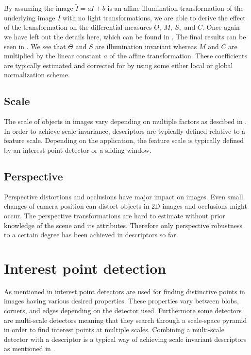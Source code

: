 \documentclass[thesis.tex]{subfiles}
\begin{document}
By assuming the image $\tilde{I} = a I +  b$ is an affine illumination transformation of the underlying image $I$ with no light transformations, we are able to derive the effect of the transformation on the differential measures $\Theta,~M,~S,$ and $C$. Once again we have left out the details here, which can be found in . The final results can be seen in . We see that $\Theta$ and $S$ are illumination invariant whereas $M$ and $C$ are multiplied by the linear constant $a$ of the affine transformation. These coefficients are typically estimated and corrected for by using some either local or global normalization scheme.

\subsection{Scale}
\label{sec:scaleInvariance}

The scale of objects in images vary depending on multiple factors as descibed in . In order to achieve scale invariance, descriptors are typically defined relative to a feature scale. Depending on the application, the feature scale is typically defined by an interest point detector or a sliding window.

\subsection{Perspective}
Perspective distortions and occlusions have major impact on images. Even small changes of camera position can distort objects in 2D images and occlusions might occur. The perspective transformations are hard to estimate without prior knowledge of the scene and its attributes. Therefore only perspective robustness to a certain degree has been achieved in descriptors so far.

\section{Interest point detection}
\label{sec:interestPointDetectors}
As mentioned in  interest point detectors are used for finding distinctive points in images having various desired properties. These properties vary between blobs, corners, and edges depending on the detector used. Furthermore some detectors are multi-scale detectors meaning that they search through a scale-space pyramid in order to find interest points at multiple scales. Combining a multi-scale detector with a descriptor is a typical way of achieving scale invariant descriptors as mentioned in .
\end{document}
